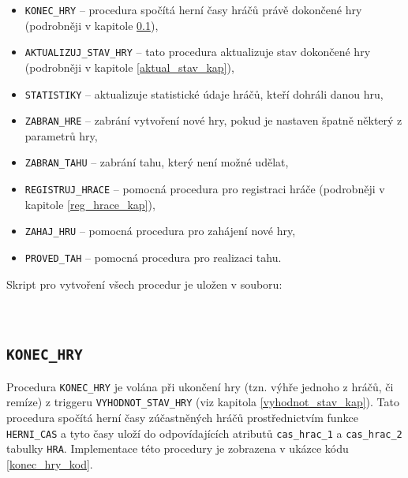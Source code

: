 \documentclass[
11pt,
a4paper,
pdftex,
czech,
titlepage
]{report}
\begin{document}
\begin{itemize}
    \item \texttt{KONEC\_HRY} -- procedura spočítá herní časy hráčů právě dokončené hry (podrobněji v kapitole \ref{konec_hry_kap}),
    \item \texttt{AKTUALIZUJ\_STAV\_HRY} -- tato procedura aktualizuje stav dokončené hry (podrobněji v kapitole \ref{aktual_stav_kap}),
    \item \texttt{STATISTIKY} -- aktualizuje statistické údaje hráčů, kteří dohráli danou hru,
    \item \texttt{ZABRAN\_HRE} -- zabrání vytvoření nové hry, pokud je nastaven špatně některý z parametrů hry,
    \item \texttt{ZABRAN\_TAHU} -- zabrání tahu, který není možné udělat,
    \item \texttt{REGISTRUJ\_HRACE} -- pomocná procedura pro registraci hráče (podrobněji v kapitole \ref{reg_hrace_kap}),
    \item \texttt{ZAHAJ\_HRU} -- pomocná procedura pro zahájení nové hry,
    \item \texttt{PROVED\_TAH} -- pomocná procedura pro realizaci tahu.
\end{itemize}

\noindent Skript pro vytvoření všech procedur je uložen v souboru:
\begin{center}
\noindent {}\\[1\baselineskip]
\end{center}

\subsection{\texttt{KONEC\_HRY}}\label{konec_hry_kap}
Procedura \texttt{KONEC\_HRY} je volána při ukončení hry (tzn. výhře jednoho z hráčů, či remíze) z triggeru \texttt{VYHODNOT\_STAV\_HRY} (viz kapitola \ref{vyhodnot_stav_kap}). Tato procedura spočítá herní časy zúčastněných hráčů prostřednictvím funkce \texttt{HERNI\_CAS} a tyto časy uloží do odpovídajících atributů \texttt{cas\_hrac\_1} a \texttt{cas\_hrac\_2} tabulky \texttt{HRA}. Implementace této procedury je zobrazena v ukázce kódu \ref{konec_hry_kod}.
\end{document}
